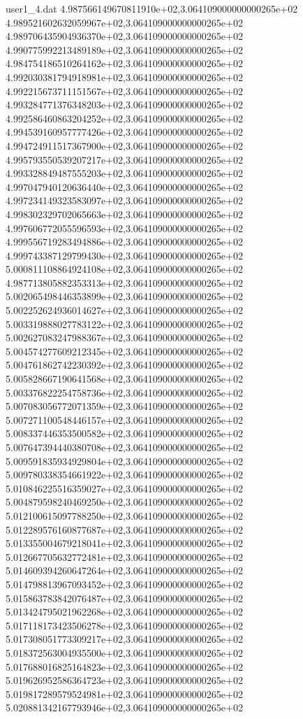 \begin{filecontents}{user1_4.dat}
4.987566149670811910e+02,3.064109000000000265e+02
4.989521602632059967e+02,3.064109000000000265e+02
4.989706435904936370e+02,3.064109000000000265e+02
4.990775992213489189e+02,3.064109000000000265e+02
4.984754186510264162e+02,3.064109000000000265e+02
4.992030381794918981e+02,3.064109000000000265e+02
4.992215673711151567e+02,3.064109000000000265e+02
4.993284771376348203e+02,3.064109000000000265e+02
4.992586460863204252e+02,3.064109000000000265e+02
4.994539160957777426e+02,3.064109000000000265e+02
4.994724911517367900e+02,3.064109000000000265e+02
4.995793550539207217e+02,3.064109000000000265e+02
4.993328849487555203e+02,3.064109000000000265e+02
4.997047940120636440e+02,3.064109000000000265e+02
4.997234149323583097e+02,3.064109000000000265e+02
4.998302329702065663e+02,3.064109000000000265e+02
4.997606772055596593e+02,3.064109000000000265e+02
4.999556719283494886e+02,3.064109000000000265e+02
4.999743387129799430e+02,3.064109000000000265e+02
5.000811108864924108e+02,3.064109000000000265e+02
4.987713805882353313e+02,3.064109000000000265e+02
5.002065498446353899e+02,3.064109000000000265e+02
5.002252624936014627e+02,3.064109000000000265e+02
5.003319888027783122e+02,3.064109000000000265e+02
5.002627083247988367e+02,3.064109000000000265e+02
5.004574277609212345e+02,3.064109000000000265e+02
5.004761862742230392e+02,3.064109000000000265e+02
5.005828667190641568e+02,3.064109000000000265e+02
5.003376822254758736e+02,3.064109000000000265e+02
5.007083056772071359e+02,3.064109000000000265e+02
5.007271100548446157e+02,3.064109000000000265e+02
5.008337446353500582e+02,3.064109000000000265e+02
5.007647394440380708e+02,3.064109000000000265e+02
5.009591835934929804e+02,3.064109000000000265e+02
5.009780338354661922e+02,3.064109000000000265e+02
5.010846225516359027e+02,3.064109000000000265e+02
5.004879598240469250e+02,3.064109000000000265e+02
5.012100615097788250e+02,3.064109000000000265e+02
5.012289576160877687e+02,3.064109000000000265e+02
5.013355004679218041e+02,3.064109000000000265e+02
5.012667705632772481e+02,3.064109000000000265e+02
5.014609394260647264e+02,3.064109000000000265e+02
5.014798813967093452e+02,3.064109000000000265e+02
5.015863783842076487e+02,3.064109000000000265e+02
5.013424795021962268e+02,3.064109000000000265e+02
5.017118173423506278e+02,3.064109000000000265e+02
5.017308051773309217e+02,3.064109000000000265e+02
5.018372563004935500e+02,3.064109000000000265e+02
5.017688016825164823e+02,3.064109000000000265e+02
5.019626952586364723e+02,3.064109000000000265e+02
5.019817289579524981e+02,3.064109000000000265e+02
5.020881342167793946e+02,3.064109000000000265e+02

\end{filecontents}
